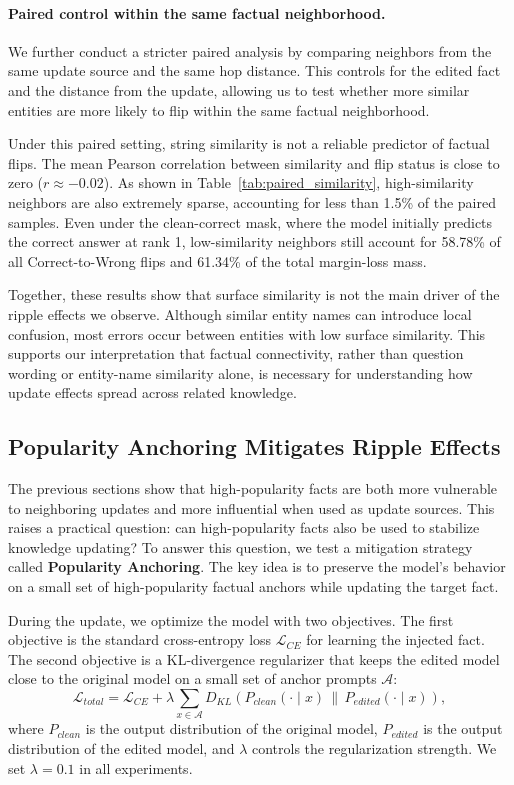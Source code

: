 \paragraph{Paired control within the same factual neighborhood.}
We further conduct a stricter paired analysis by comparing neighbors from the same update source and the same hop distance. This controls for the edited fact and the distance from the update, allowing us to test whether more similar entities are more likely to flip within the same factual neighborhood.

Under this paired setting, string similarity is not a reliable predictor of factual flips. The mean Pearson correlation between similarity and flip status is close to zero ($r \approx -0.02$). As shown in Table~\ref{tab:paired_similarity}, high-similarity neighbors are also extremely sparse, accounting for less than 1.5\% of the paired samples. Even under the clean-correct mask, where the model initially predicts the correct answer at rank 1, low-similarity neighbors still account for 58.78\% of all Correct-to-Wrong flips and 61.34\% of the total margin-loss mass.

Together, these results show that surface similarity is not the main driver of the ripple effects we observe. Although similar entity names can introduce local confusion, most errors occur between entities with low surface similarity. This supports our interpretation that factual connectivity, rather than question wording or entity-name similarity alone, is necessary for understanding how update effects spread across related knowledge.

\subsection{Popularity Anchoring Mitigates Ripple Effects}
\label{subsec:mitigation}

The previous sections show that high-popularity facts are both more vulnerable to neighboring updates and more influential when used as update sources. This raises a practical question: can high-popularity facts also be used to stabilize knowledge updating? To answer this question, we test a mitigation strategy called \textbf{Popularity Anchoring}. The key idea is to preserve the model's behavior on a small set of high-popularity factual anchors while updating the target fact.

During the update, we optimize the model with two objectives. The first objective is the standard cross-entropy loss $\mathcal{L}_{CE}$ for learning the injected fact. The second objective is a KL-divergence regularizer that keeps the edited model close to the original model on a small set of anchor prompts $\mathcal{A}$:
\[
\mathcal{L}_{total}
=
\mathcal{L}_{CE}
+
\lambda
\sum_{x \in \mathcal{A}}
D_{KL}
\left(
P_{clean}(\cdot \mid x)
\,\|\, 
P_{edited}(\cdot \mid x)
\right),
\]
where $P_{clean}$ is the output distribution of the original model, $P_{edited}$ is the output distribution of the edited model, and $\lambda$ controls the regularization strength. We set $\lambda=0.1$ in all experiments.

